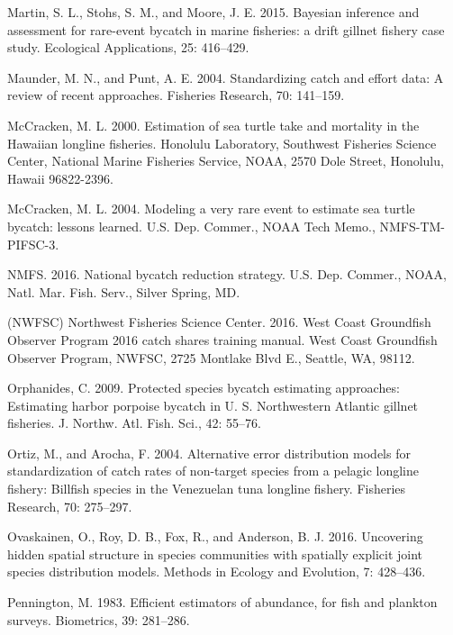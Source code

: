 \documentclass[]{article}
\begin{document}
\leavevmode\hypertarget{ref-martin2015}{}%
Martin, S. L., Stohs, S. M., and Moore, J. E. 2015. Bayesian inference
and assessment for rare-event bycatch in marine fisheries: a drift
gillnet fishery case study. Ecological Applications, 25: 416--429.

\leavevmode\hypertarget{ref-maunder2004}{}%
Maunder, M. N., and Punt, A. E. 2004. Standardizing catch and effort
data: A review of recent approaches. Fisheries Research, 70: 141--159.

\leavevmode\hypertarget{ref-mccracken2000}{}%
McCracken, M. L. 2000. Estimation of sea turtle take and mortality in
the Hawaiian longline fisheries. Honolulu Laboratory, Southwest
Fisheries Science Center, National Marine Fisheries Service, NOAA, 2570
Dole Street, Honolulu, Hawaii 96822-2396.

\leavevmode\hypertarget{ref-mccracken2004}{}%
McCracken, M. L. 2004. Modeling a very rare event to estimate sea turtle
bycatch: lessons learned. U.S. Dep. Commer., NOAA Tech Memo.,
NMFS-TM-PIFSC-3.

\leavevmode\hypertarget{ref-nmfs2016bycatch}{}%
NMFS. 2016. National bycatch reduction strategy. U.S. Dep. Commer.,
NOAA, Natl. Mar. Fish. Serv., Silver Spring, MD.

\leavevmode\hypertarget{ref-nwfsc2016}{}%
(NWFSC) Northwest Fisheries Science Center. 2016. West Coast Groundfish
Observer Program 2016 catch shares training manual. West Coast
Groundfish Observer Program, NWFSC, 2725 Montlake Blvd E., Seattle, WA,
98112.

\leavevmode\hypertarget{ref-orphanides2009}{}%
Orphanides, C. 2009. Protected species bycatch estimating approaches:
Estimating harbor porpoise bycatch in U. S. Northwestern Atlantic
gillnet fisheries. J. Northw. Atl. Fish. Sci., 42: 55--76.

\leavevmode\hypertarget{ref-ortiz2004}{}%
Ortiz, M., and Arocha, F. 2004. Alternative error distribution models
for standardization of catch rates of non-target species from a pelagic
longline fishery: Billfish species in the Venezuelan tuna longline
fishery. Fisheries Research, 70: 275--297.

\leavevmode\hypertarget{ref-ovaskainen2016}{}%
Ovaskainen, O., Roy, D. B., Fox, R., and Anderson, B. J. 2016.
Uncovering hidden spatial structure in species communities with
spatially explicit joint species distribution models. Methods in Ecology
and Evolution, 7: 428--436.

\leavevmode\hypertarget{ref-pennington1983}{}%
Pennington, M. 1983. Efficient estimators of abundance, for fish and
plankton surveys. Biometrics, 39: 281--286.
\end{document}
